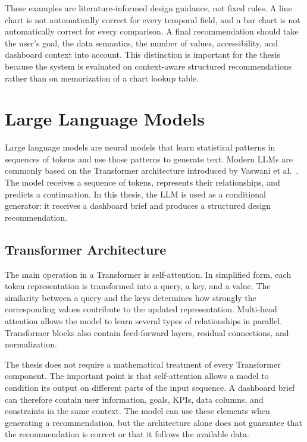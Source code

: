 These examples are literature-informed design guidance, not fixed rules. A line chart is not automatically correct for every temporal field, and a bar chart is not automatically correct for every comparison. A final recommendation should take the user's goal, the data semantics, the number of values, accessibility, and dashboard context into account. This distinction is important for the thesis because the system is evaluated on context-aware structured recommendations rather than on memorization of a chart lookup table.

\section{Large Language Models}

Large language models are neural models that learn statistical patterns in sequences of tokens and use those patterns to generate text. Modern LLMs are commonly based on the Transformer architecture introduced by Vaswani et al.~\cite{vaswani2017attention}. The model receives a sequence of tokens, represents their relationships, and predicts a continuation. In this thesis, the LLM is used as a conditional generator: it receives a dashboard brief and produces a structured design recommendation.

\subsection{Transformer Architecture}

The main operation in a Transformer is self-attention. In simplified form, each token representation is transformed into a query, a key, and a value. The similarity between a query and the keys determines how strongly the corresponding values contribute to the updated representation. Multi-head attention allows the model to learn several types of relationships in parallel. Transformer blocks also contain feed-forward layers, residual connections, and normalization.

The thesis does not require a mathematical treatment of every Transformer component. The important point is that self-attention allows a model to condition its output on different parts of the input sequence. A dashboard brief can therefore contain user information, goals, KPIs, data columns, and constraints in the same context. The model can use these elements when generating a recommendation, but the architecture alone does not guarantee that the recommendation is correct or that it follows the available data.

